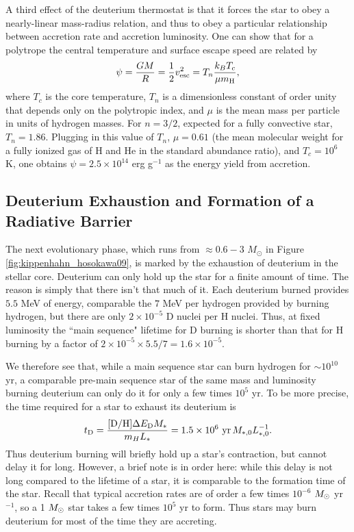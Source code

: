 A third effect of the deuterium thermostat is that it forces the star to obey a nearly-linear mass-radius relation, and thus to obey a particular relationship between accretion rate and accretion luminosity. One can show that for a polytrope the central temperature and surface escape speed are related by
\begin{equation}
\psi = \frac{GM}{R} = \frac{1}{2}v_{\rm esc}^2 = T_n \frac{k_B T_c}{\mu m_{\rm H}},
\end{equation}
where $T_c$ is the core temperature, $T_n$ is a dimensionless constant of order unity that depends only on the polytropic index, and $\mu$ is the mean mass per particle in units of hydrogen masses. For $n=3/2$, expected for a fully convective star, $T_n = 1.86$. Plugging in this value of $T_n$, $\mu=0.61$ (the mean molecular weight for a fully ionized gas of H and He in the standard abundance ratio), and $T_c = 10^6$ K, one obtains $\psi = 2.5\times 10^{14}$ erg g$^{-1}$ as the energy yield from accretion.

\subsection{Deuterium Exhaustion and Formation of a Radiative Barrier}

The next evolutionary phase, which runs from $\approx 0.6 - 3$ $M_\odot$ in Figure \ref{fig:kippenhahn_hosokawa09}, is marked by the exhaustion of deuterium in the stellar core. Deuterium can only hold up the star for a finite amount of time. The reason is simply that there isn't that much of it. Each deuterium burned provides $5.5$ MeV of energy, comparable the $7$ MeV per hydrogen  provided by burning hydrogen, but there are only $2\times 10^{-5}$ D nuclei per H nuclei. Thus, at fixed luminosity the ``main sequence" lifetime for D burning is shorter than that for H burning by a factor of $2\times 10^{-5} \times 5.5/7 = 1.6\times 10^{-5}$.

We therefore see that, while a main sequence star can burn hydrogen for $\sim 10^{10}$ yr, a comparable pre-main sequence star of the same mass and luminosity burning deuterium can only do it for only a few times $10^5$ yr. To be more precise, the time required for a star to exhaust its deuterium is
\begin{equation}
t_{\rm D} = \frac{[\mbox{D}/\mbox{H}] \Delta E_{\rm D} M_*}{m_H L_*} = 1.5\times 10^6\mbox{ yr} \, M_{*,0} L_{*,0}^{-1}.
\end{equation}
Thus deuterium burning will briefly hold up a star's contraction, but cannot delay it for long. However, a brief note is in order here: while this delay is not long compared to the lifetime of a star, it is comparable to the formation time of the star. Recall that typical accretion rates are of order a few times $10^{-6}$ $M_{\odot}$ yr$^{-1}$, so a 1 $M_{\odot}$ star takes a few times $10^5$ yr to form. Thus stars may burn deuterium for most of the time they are accreting.

